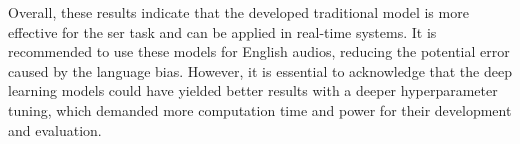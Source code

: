 Overall, these results indicate that the developed traditional model is more effective for the \ac{ser} task and can be applied in real-time systems. It is recommended to use these models for English audios, reducing the potential error caused by the language bias. However, it is essential to acknowledge that the deep learning models could have yielded better results with a deeper hyperparameter tuning, which demanded more computation time and power for their development and evaluation.


\begin{table}[H]
	\centering
	\caption{Final models trained on \ac{iemo} and evaluated on different datasets.}
	\label{final_models}
\end{table}


